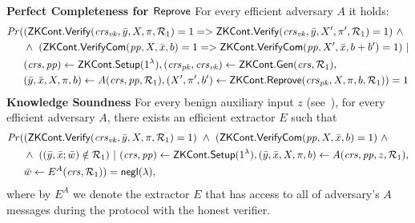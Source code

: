 \begin{definition}[ZK Continuations]
\noindent \textbf{Perfect Completeness for ${\mathsf{Reprove}}$} For every efficient adversary $A$ it holds: 
\begin{align*}
\mathit{Pr} (& (\ZKCont.\Verify(\crsvk, \bar{y}, X, \pi, \relone) = 1  = >  \ZKCont.\Verify(\crsvk, \bar{y}, X', \pi', \relone) = 1)  \ \wedge \  \\
                   & \wedge \ (\ZKCont.\VerifyCom (\pp, X, \barx, b) = 1 => \ZKCont.\VerifyCom (\pp, X', \barx, b + b') = 1) \ | \\
                   & (\crs, \pp) \leftarrow \ZKCont.\Setup (1^{\lambda}), (\crspk, \crsvk) \leftarrow \ZKCont.\Gen(\crs, \relone), \\ 
                   & (\bary, \barx, X, \pi, b) \leftarrow A(\crs,\pp, \relone), (X', \pi', b') \leftarrow \ZKCont.\Reprove(\crspk, X, \pi, b, \relone)) = 1
\end{align*}
\noindent \textbf{Knowledge Soundness} For every benign auxiliary input $z$ (see~\cite{bening_auxiliary}), 
for every efficient adversary $A$, there exists an efficient extractor $E$ such that 
\begin{align*}
\mathit{Pr} (& ({\mathsf{ZKCont}}.{\mathsf{Verify}}(\mathit{crs}_{\mathit{vk}}, \bar{y}, X, \pi, \mathcal{R}_1) = 1) \ \wedge \ ({\mathsf{ZKCont}}.{\mathsf{VerifyCom}}(\mathit{pp}, X, \bar{x}, b) = 1) \ \wedge\ \\
                   & \wedge \ ( (\bar{y}, \bar{x}; \bar{w}) \notin \mathcal{R}_1) \ | \ (\mathit{crs}, \mathit{pp}) \leftarrow {\ensuremath{\mathsf{ZKCont}}}.{\mathsf{Setup}} (1^{\lambda}), (\bar{y}, \bar{x}, X, \pi, b) \leftarrow A(\mathit{crs}, \mathit{pp}, z, \mathcal{R}_1), \\ 
& \bar{w} \leftarrow E^{A}(\mathit{crs}, \mathcal{R}_1)) = \mathsf{negl} (\lambda),
\end{align*}
\noindent %
where by $ E^{A}$ we denote the extractor $E$ that has access to all of adversary's $A$ messages during the protocol with the honest verifier. \\


\end{definition}
